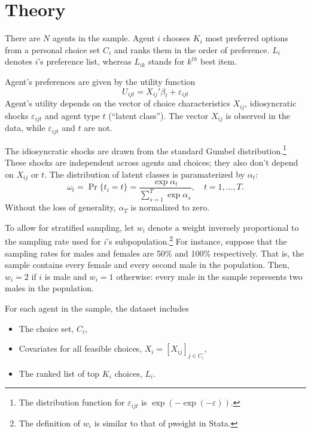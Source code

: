 \documentclass[12pt]{article}
\begin{document}
\section{Theory}

There are $N$ agents in the sample. Agent $i$ chooses $K_i$ most preferred options from a personal choice set $C_i$ and ranks them in the order of preference. $L_i$ denotes $i$'s preference list, whereas $L_{ik}$ stands for $k^{th}$ best item.

Agent's preferences are given by the utility function
\begin{equation*}
	U_{ijt} = X_{ij}'\beta_t + \varepsilon_{ijt}
\end{equation*}
Agent's utility depends on the vector of choice characteristics $X_{ij}$, idiosyncratic shocks $\varepsilon_{ijt}$ and agent type $t$ (``latent class''). The vector $X_{ij}$ is observed in the data, while $\varepsilon_{ijt}$ and $t$ are not.

The idiosyncratic shocks are drawn from the standard Gumbel distribution.\footnote{The distribution function for $\varepsilon_{ijt}$ is $\exp(-\exp(-\varepsilon))$.} These shocks are independent across agents and choices; they also don't depend on $X_{ij}$ or $t$. The distribution of latent classes is paramaterized by $\alpha_t$:
\begin{equation*}
	\omega_t = \Pr\{t_i=t\} = \frac{\exp\alpha_t}{\sum_{s=1}^T\exp\alpha_s}, \quad t=1,\dots,T.
\end{equation*}
Without the loss of generality, $\alpha_T$ is normalized to zero.

To allow for stratified sampling, let $w_i$ denote a weight inversely proportional to the sampling rate used for $i$'s subpopulation.\footnote{The definition of $w_i$ is similar to that of pweight in Stata.} For instance, suppose that the sampling rates for males and females are 50\% and 100\% respectively. That is, the sample contains every female and every second male in the population. Then, $w_i = 2$ if $i$ is male and $w_i=1$ otherwise: every male in the sample represents two males in the population.

For each agent in the sample, the dataset includes
\begin{itemize}
	\item The choice set, $C_i$,
	\item Covariates for all feasible choices, $X_i = [X_{ij}]_{j\in C_i}$,
	\item The ranked list of top $K_i$ choices, $L_i$.
\end{itemize}
\end{document}
